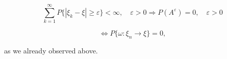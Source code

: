 $$\sum_{k=1}^{\infty} P\{|\xi_k - \xi| \geq \varepsilon\} < \infty, \quad \varepsilon > 0 \Rightarrow P(A^\varepsilon) = 0, \quad \varepsilon > 0$$

$$\Leftrightarrow P\{\omega : \xi_n \rightarrow \xi\} = 0,$$

as we already observed above.
